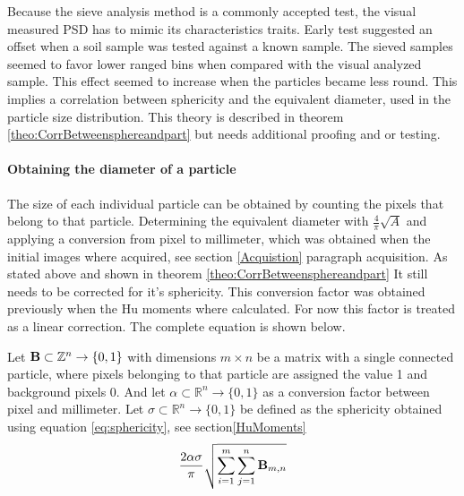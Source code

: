 \documentclass[11pt,fleqn,,a4paper,twoside,openright]{book}
\begin{document}
Because the sieve analysis method is a commonly accepted test, the visual measured PSD has to mimic its characteristics traits. Early test suggested an offset when a soil sample was tested against a known sample. The sieved samples seemed to favor lower ranged bins when compared with the visual analyzed sample. This effect seemed to increase when the particles became less round. This implies a correlation between sphericity and the equivalent diameter, used in the particle size distribution. This theory is described in theorem \ref{theo:CorrBetweensphereandpart} but needs additional proofing and or testing.

\paragraph{Obtaining the diameter of a particle}
The size of each individual particle can be obtained by counting the pixels that belong to that particle. Determining the equivalent diameter with $ \frac{4}{\pi}\sqrt{A} $ and applying a conversion from pixel to millimeter, which was obtained when the initial images where acquired, see section \ref{Acquistion} paragraph acquisition. As stated above and shown in theorem \ref{theo:CorrBetweensphereandpart} It still needs to be corrected for it's sphericity. This conversion factor was obtained previously when the Hu moments where calculated. For now this factor is treated as a linear correction. The complete equation is shown below.

\begin{sBox}
	Let $\mat{B} \subset \mathbb{Z}^n \rightarrow \{0, 1\}$ with dimensions $ m \times n $ be a matrix with a single connected particle, where pixels belonging to that particle are assigned the value 1 and background pixels 0. And let $ \alpha \subset \mathbb{R}^n \rightarrow \{0, 1\} $ as a conversion factor between pixel and millimeter. Let $ \sigma \subset \mathbb{R}^n \rightarrow \{0, 1\} $ be defined as the sphericity obtained using equation \ref{eq:sphericity}, see section\ref{HuMoments}
	\begin{equation}\label{eq:EquivelentDiameter}
	\frac{2 \alpha \sigma}{\pi} \sqrt{ \sum\limits_{i=1}^{m}\sum\limits_{j=1}^{n}\mat{B}_{m,n}} 
	\end{equation}
\end{sBox}
\end{document}
